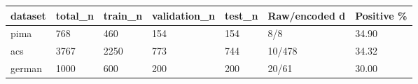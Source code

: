 \begingroup\footnotesize\setlength{\tabcolsep}{3pt}
\begin{tabular}{lllllll}
\toprule
dataset & total\_n & train\_n & validation\_n & test\_n & Raw/encoded d & Positive \% \\
\midrule
pima & 768 & 460 & 154 & 154 & 8/8 & 34.90 \\
acs & 3767 & 2250 & 773 & 744 & 10/478 & 34.32 \\
german & 1000 & 600 & 200 & 200 & 20/61 & 30.00 \\
\bottomrule
\end{tabular}
\endgroup
